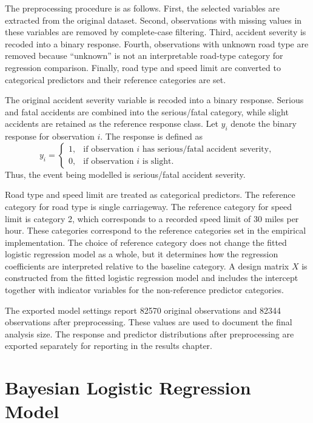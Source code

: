 The preprocessing procedure is as follows. First, the selected variables are extracted from the original dataset. Second, observations with missing values in these variables are removed by complete-case filtering. Third, accident severity is recoded into a binary response. Fourth, observations with unknown road type are removed because ``unknown'' is not an interpretable road-type category for regression comparison. Finally, road type and speed limit are converted to categorical predictors and their reference categories are set.

The original accident severity variable is recoded into a binary response. Serious and fatal accidents are combined into the serious/fatal category, while slight accidents are retained as the reference response class. Let $y_i$ denote the binary response for observation $i$. The response is defined as
\[
y_i =
\begin{cases}
1, & \text{if observation } i \text{ has serious/fatal accident severity},\\
0, & \text{if observation } i \text{ is slight}.
\end{cases}
\]
Thus, the event being modelled is serious/fatal accident severity.

Road type and speed limit are treated as categorical predictors. The reference category for road type is single carriageway. The reference category for speed limit is category 2, which corresponds to a recorded speed limit of 30 miles per hour. These categories correspond to the reference categories set in the empirical implementation. The choice of reference category does not change the fitted logistic regression model as a whole, but it determines how the regression coefficients are interpreted relative to the baseline category. A design matrix $X$ is constructed from the fitted logistic regression model and includes the intercept together with indicator variables for the non-reference predictor categories.

The exported model settings report 82570 original observations and 82344 observations after preprocessing. These values are used to document the final analysis size. The response and predictor distributions after preprocessing are exported separately for reporting in the results chapter.

\section{Bayesian Logistic Regression Model}


